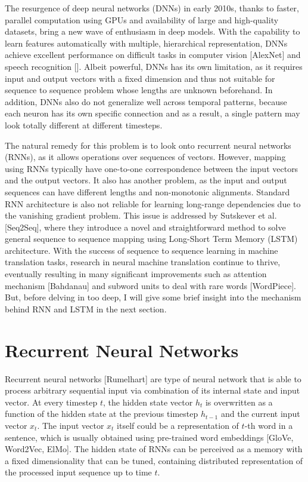 \documentclass[12pt]{extarticle}
\begin{document}
The resurgence of deep neural networks (DNNs) in early 2010s, thanks to faster, parallel computation using GPUs and availability of large and high-quality datasets, bring a new wave of enthusiasm in deep models. With the capability to learn features automatically with multiple, hierarchical representation, DNNs achieve excellent performance on difficult tasks in computer vision [AlexNet] and speech recognition []. Albeit powerful, DNNs has its own limitation, as it requires input and output vectors with a fixed dimension and thus not suitable for sequence to sequence problem whose lengths are unknown beforehand. In addition, DNNs also do not generalize well across temporal patterns, because each neuron has its own specific connection and as a result, a single pattern may look totally different at different timesteps.

The natural remedy for this problem is to look onto recurrent neural networks (RNNs), as it allows operations over sequences of vectors. However, mapping using RNNs typically have one-to-one correspondence between the input vectors and the output vectors. It also has another problem, as the input and output sequences can have different lengths and non-monotonic alignments. Standard RNN architecture is also not reliable for learning long-range dependencies due to the vanishing gradient problem. This issue is addressed by Sutskever et al. [Seq2Seq], where they introduce a novel and straightforward method to solve general sequence to sequence mapping using Long-Short Term Memory (LSTM) architecture. With the success of sequence to sequence learning in machine translation tasks, research in neural machine translation continue to thrive, eventually resulting in many significant improvements such as attention mechanism [Bahdanau] and subword units to deal with rare words [WordPiece]. But, before delving in too deep, I will give some brief insight into the mechanism behind RNN and LSTM in the next section. 

\section*{Recurrent Neural Networks} %

Recurrent neural networks [Rumelhart] are type of neural network that is able to process arbitrary sequential input via combination of its internal state and input vector. At every timestep $t$, the hidden state vector $h_{t}$ is overwritten as a function of the hidden state at the previous timestep $h_{t-1}$ and the current input vector $x_{t}$. The input vector $x_{t}$ itself could be a representation of $t$-th word in a sentence, which is usually obtained using pre-trained word embeddings [GloVe, Word2Vec, ElMo]. The hidden state of RNNs can be perceived as a memory with a fixed dimensionality that can be tuned, containing distributed representation of the processed input sequence up to time $t$.
\end{document}
